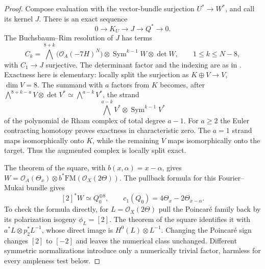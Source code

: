 \documentclass[11pt,a4paper]{article}
\theoremstyle{definition}\newtheorem{definition}[theorem]{Definition}
\theoremstyle{remark}\newtheorem{remark}[theorem]{Remark}
\newcommand{\cO}{\mathcal O}\newcommand{\CH}{\operatorname{CH}}\newcommand{\cl}{\operatorname{cl}}
\begin{document}
\begin{proof}
Compose evaluation with the vector-bundle surjection $U^*\to W^*$,
and call its kernel $J$. There is an exact sequence
\begin{equation}\label{eq:M7kernels}
 0\longrightarrow K_U\longrightarrow J\longrightarrow Q^*
                   \longrightarrow0.
\end{equation}
The Buchsbaum--Rim resolution of $J$ has terms
\begin{equation}\label{eq:M7BR}
 C_k=\bigwedge^{8+k}\bigl(\cO_A(-7H)^N\bigr)
             \otimes\operatorname{Sym}^{k-1}W\otimes\det W,
 \qquad 1\le k\le N-8,
\end{equation}
with $C_1\to J$ surjective. The determinant factor and the indexing are
as in \citet[pp.~41--42]{RaicuSam22}. Exactness here is elementary:
locally split the surjection as $K\oplus V\to V$, $\dim V=8$.
The summand with $a$ factors from $K$ becomes, after
$\bigwedge^{8+k-a}V\otimes\det V^*
\simeq\bigwedge^{a-k}V^*$, the strand
\[
 \bigwedge^{a-k}V^*\otimes\operatorname{Sym}^{k-1}V^*
\]
of the polynomial de Rham complex of total degree $a-1$.
For $a\ge2$ the Euler contracting homotopy proves exactness in
characteristic zero. The $a=1$ strand maps isomorphically onto $K$,
while the remaining $V$ maps isomorphically onto the target.
Thus the augmented complex is locally split exact.

The theorem of the square, with $b(x,\alpha)=x-\alpha$, gives
$W=\cO_A(\Theta_x)\otimes b^*\mathrm{FM}(\cO_X(2\Theta))$.
The pullback formula for this Fourier--Mukai bundle gives
\begin{equation}\label{eq:M7splitW}
 [2]^*W\simeq Q_0^{\oplus8},\qquad
 c_1(Q_0)=4\Theta_x-2\Theta_{x-\alpha}.
\end{equation}
To check the formula directly, for $L=\cO_X(2\Theta)$ pull the
Poincar\'e family back by its polarization isogeny $\phi_L=[2]$.
The theorem of the square identifies it with
$a^*L\otimes p_2^*L^{-1}$, whose direct image is
$H^0(L)\otimes L^{-1}$. Changing the Poincar\'e sign changes $[2]$
to $[-2]$ and leaves the numerical class unchanged.
Different symmetric normalizations introduce only a numerically trivial
factor, harmless for every ampleness test below.


\end{proof}
\end{document}

